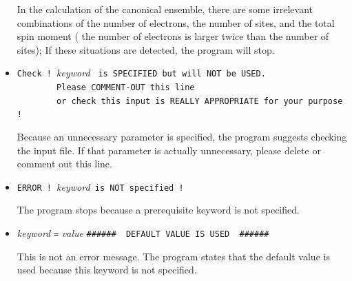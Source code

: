 \begin{itemize}
In the calculation of the canonical ensemble, 
there are some irrelevant combinations of the number of electrons, the number of sites, and the total spin moment
( the number of electrons is larger twice than the number of sites);
If these situations are detected, the program will stop.

\item \verb|Check ! |\textit{keyword} \verb| is SPECIFIED but will NOT be USED.|\\
      \verb|        Please COMMENT-OUT this line|\\
      \verb|        or check this input is REALLY APPROPRIATE for your purpose !|

Because an unnecessary parameter is specified, the program suggests checking the input file.
If that parameter is actually unnecessary, please delete or comment out this line.

\item \verb|ERROR ! |\textit{keyword}\verb| is NOT specified !|

The program stops because a prerequisite keyword is not specified.

\item \textit{keyword} \verb|=| \textit{value} \verb|######  DEFAULT VALUE IS USED  ######|

This is not an error message.
The program states that the default value is used because this keyword is not specified.

\end{itemize}
 
